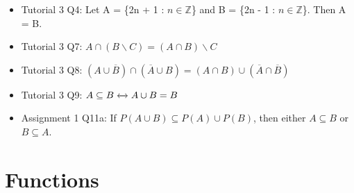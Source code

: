 \documentclass{article}
\begin{document}
\begin{itemize}
    \item Tutorial 3 Q4: Let A = \{2n + 1 : $n \in \mathbb{Z}$\} and B = \{2n - 1 : $n \in \mathbb{Z}$\}. Then A = B.
    \item Tutorial 3 Q7: $A \cap (B \backslash C)=(A \cap B) \backslash C$
    \item Tutorial 3 Q8: $(A \cup \overline{B}) \cap (\overline{A} \cup B) = (A \cap B) \cup (\overline{A} \cap \overline{B})$
    \item Tutorial 3 Q9: $A \subseteq B \xleftrightarrow{} A \cup B = B$
    \item Assignment 1 Q11a: If $P(A \cup B) \subseteq P(A) \cup P(B)$, then either $A \subseteq B$ or $B \subseteq A$.
\end{itemize}

\section*{Functions}
\end{document}
